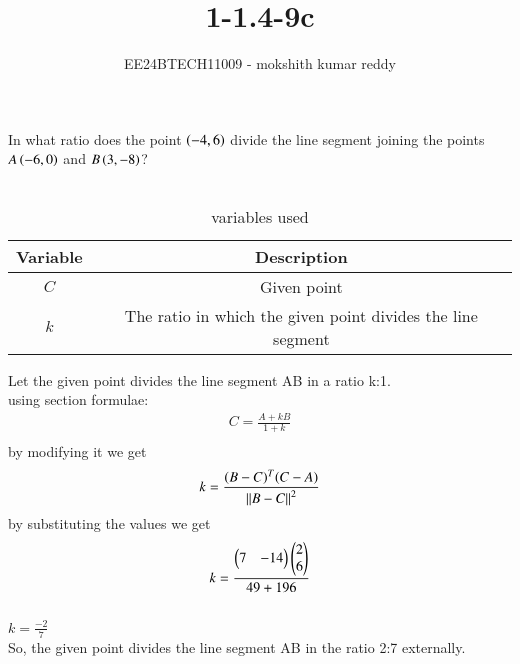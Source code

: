 \documentclass[journal]{IEEEtran}
\begin{document}

\vspace{3cm}

\title{1-1.4-9c}
\author{EE24BTECH11009 - mokshith kumar reddy}
{\let\newpage\relax\maketitle}

\renewcommand{\thefigure}{\theenumi}
\renewcommand{\thetable}{\theenumi}
\setlength{\intextsep}{10pt} %


\renewcommand{\thetable}{\theenumi}

In what ratio does the point $\left(-4,6\right)$ divide the line segment joining the points $A\left(-6,0\right)$ and $B\left(3,-8\right)$?\\
\solution \\
\begin{table}[h]
    \centering
    \begin{tabular}{|c|c|}
        \hline
        Variable & Description \\
        \hline
        $C$ & Given point\\
        \hline
        $k$ & The ratio in which the given point divides the line segment\\
        \hline
    \end{tabular}
    \caption{variables used}
    \label{tab:my_label}
\end{table}
Let the given point divides the line segment AB in a ratio k:1.\\
using section formulae:\\
\begin{align}
C=\frac{A+kB}{1+k}\\
\end{align}
by modifying it we get\\
\begin{align}
k=\frac{(B-C)^T(C-A)}{\left\vert\left\vert B-C\right\vert\right\vert^2}
\end{align}
by substituting the values we get\\
\begin{align}
k=\frac{
\begin{pmatrix}
7 & -14
\end{pmatrix}
\begin{pmatrix}
2\\
6
\end{pmatrix}
}{49+196}
\end{align}\\
$k=\frac{-2}{7}$\\
So, the given point divides the line segment AB in the ratio 2:7 externally.
\end{document}
